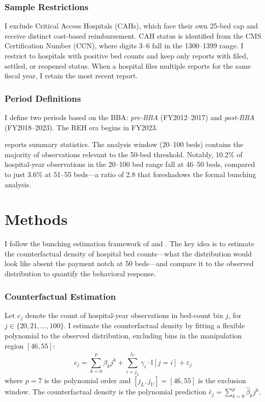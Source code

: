 \documentclass[12pt]{article}
\newcommand{\ind}{\mathbb{I}}
\begin{document}
\subsubsection*{Sample Restrictions} I exclude Critical Access Hospitals (CAHs), which face their own 25-bed cap and receive distinct cost-based reimbursement. CAH status is identified from the CMS Certification Number (CCN), where digits 3--6 fall in the 1300--1399 range. I restrict to hospitals with positive bed counts and keep only reports with filed, settled, or reopened status. When a hospital files multiple reports for the same fiscal year, I retain the most recent report.

\subsubsection*{Period Definitions} I define two periods based on the BBA: \textit{pre-BBA} (FY2012--2017) and \textit{post-BBA} (FY2018--2023). The REH era begins in FY2023.

 reports summary statistics. The analysis window (20--100 beds) contains the majority of observations relevant to the 50-bed threshold. Notably, 10.2\% of hospital-year observations in the 20--100 bed range fall at 46--50 beds, compared to just 3.6\% at 51--55 beds---a ratio of 2.8 that foreshadows the formal bunching analysis.



\section{Methods}\label{sec:methods}

I follow the bunching estimation framework of \citet{kleven2016bunching} and \citet{kleven2013using}. The key idea is to estimate the counterfactual density of hospital bed counts---what the distribution would look like absent the payment notch at 50 beds---and compare it to the observed distribution to quantify the behavioral response.

\subsubsection*{Counterfactual Estimation} Let $c_j$ denote the count of hospital-year observations in bed-count bin $j$, for $j \in \{20, 21, \ldots, 100\}$. I estimate the counterfactual density by fitting a flexible polynomial to the observed distribution, excluding bins in the manipulation region $[46, 55]$:
\begin{equation}
c_j = \sum_{k=0}^{p} \beta_k j^k + \sum_{i=j_L}^{j_U} \gamma_i \cdot \ind[j = i] + \varepsilon_j
\label{eq:polynomial}
\end{equation}
where $p = 7$ is the polynomial order and $[j_L, j_U] = [46, 55]$ is the exclusion window. The counterfactual density is the polynomial prediction $\hat{c}_j = \sum_{k=0}^{p} \hat{\beta}_k j^k$.
\end{document}
